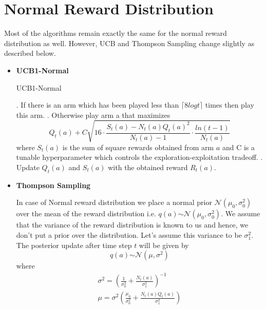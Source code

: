 \documentclass{article}
\begin{document}
\section{Normal Reward Distribution}
	\label{normal_reward}
	Most of the algorithms remain exactly the same for the normal reward distribution as well. However, UCB and Thompson Sampling change slightly as described below. \\  \par
	
	\noindent %
	\begin{itemize}
		
	
	\item \textbf{UCB1-Normal}
	\begin{algorithm}
		\caption{UCB1-Normal}\label{ucb1_normal}
		\begin{algorithmic}
				. If there is an arm which has been played less than $\lceil 8 log t \rceil$ times then play this arm.
				. Otherwise play arm a that maximizes
					\begin{equation}
					\nonumber
						Q_{t}(a) + C\sqrt{16 \cdot \frac{S_{t}(a) - N_{t}(a)Q_{t}(a)^2}{N_{t}(a) - 1} \cdot \frac{ln(t-1)}{N_{t}(a)}}
					\end{equation}
					where $S_{t}(a)$ is the sum of square rewards obtained from arm $a$ and C is a tunable hyperparameter which controls the exploration-exploitation
					tradeoff. 
				. Update $Q_{t}(a)$ and $S_{t}(a)$ with the obtained reward $R_{t}(a)$.
			\EndFor
		\end{algorithmic}
	\end{algorithm}
	
	\break \break
	
	\noindent %
	
	\item \textbf{Thompson Sampling}\par
	
	\noindent %
	In case of Normal reward distribution we place a normal prior $\mathcal{N} (\mu_{0}, \sigma_{0}^{2})$ over the mean of the reward distribution i.e. $q(a) \stackrel{}{\sim} 
	\mathcal{N} (\mu_{0}, \sigma_{0}^{2})$. We assume that the variance of the reward distribution is known to us and hence, we don't put a prior over the 
	distribution. Let's assume this variance to be $\sigma_{1}^{2}$.  The posterior 
	update after time step $t$ will be given by
	\begin{equation}
	\nonumber
		q(a) \stackrel{}{\sim} \mathcal{N} (\mu, \sigma^2)
	\end{equation}
	where
	\begin{equation}
	\nonumber
	\begin{gathered}
		\sigma^2 = \left (\frac{1}{\sigma_{0}^{2}} + \frac{N_{t}(a)}{\sigma_{1}^{2}} \right ) ^{-1}  \\
		\mu = \sigma^{2} \left ( \frac{\mu_{0}}{\sigma_{0}^{2}} + \frac{N_{t}(a)Q_{t}(a)}{\sigma_{1}^{2}} \right )
	\end{gathered}
	\end{equation}
	

\end{itemize}
\end{document}
